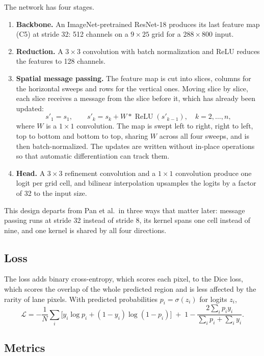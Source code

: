 \documentclass[11pt]{article}
\begin{document}
The network has four stages.
\begin{enumerate}
  \item \textbf{Backbone.} An ImageNet-pretrained ResNet-18 produces its last feature map (C5) at
        stride 32: 512 channels on a $9\times25$ grid for a $288\times800$ input.
  \item \textbf{Reduction.} A $3\times3$ convolution with batch normalization and ReLU reduces the
        features to 128 channels.
  \item \textbf{Spatial message passing.} The feature map is cut into slices, columns for the
        horizontal sweeps and rows for the vertical ones. Moving slice by slice, each slice receives
        a message from the slice before it, which has already been updated:
        \[
          s'_1 = s_1, \qquad s'_k = s_k + W * \operatorname{ReLU}(s'_{k-1}), \quad k = 2,\dots,n,
        \]
        where $W$ is a $1\times1$ convolution. The map is swept left to right, right to left, top to
        bottom and bottom to top, sharing $W$ across all four sweeps, and is then batch-normalized.
        The updates are written without in-place operations so that automatic differentiation can
        track them.
  \item \textbf{Head.} A $3\times3$ refinement convolution and a $1\times1$ convolution produce one
        logit per grid cell, and bilinear interpolation upsamples the logits by a factor of 32 to the
        input size.
\end{enumerate}
This design departs from Pan et al.\ in three ways that matter later: message passing runs at
stride 32 instead of stride 8, its kernel spans one cell instead of nine, and one kernel is shared by
all four directions.

\subsection{Loss}

The loss adds binary cross-entropy, which scores each pixel, to the Dice loss, which scores the
overlap of the whole predicted region and is less affected by the rarity of lane pixels. With
predicted probabilities $p_i = \sigma(z_i)$ for logits $z_i$,
\[
  \mathcal{L} = -\frac{1}{N}\sum_i \bigl[y_i\log p_i + (1-y_i)\log(1-p_i)\bigr]
  \;+\; 1 - \frac{2\sum_i p_i y_i}{\sum_i p_i + \sum_i y_i}.
\]

\subsection{Metrics}
\end{document}
